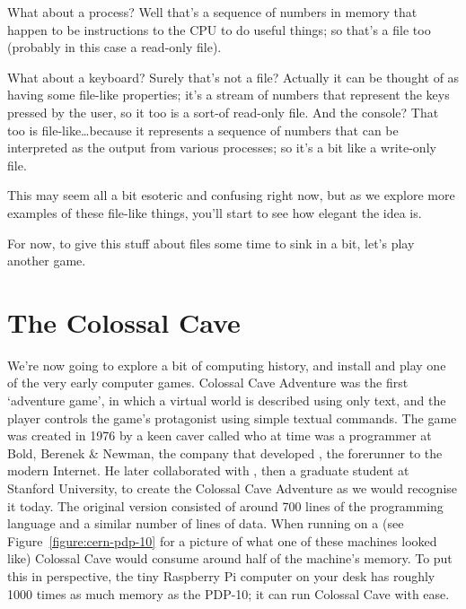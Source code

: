 What about a process? Well that's a sequence of numbers in memory that happen to be instructions to the CPU to do useful things; so that's a file too (probably in this case a read-only file). 

What about a keyboard? Surely that's not a file? Actually it can be thought of as having some file-like properties; it's a stream of numbers that represent the keys pressed by the user, so it too is a sort-of read-only file. And the console? That too is file-like\ldots because it represents a sequence of numbers that can be interpreted as the output from various processes; so it's a bit like a write-only file. 

This may seem all a bit esoteric and confusing right now, but as we explore more examples of these file-like things, you'll start to see how elegant the idea is. 

For now, to give this stuff about files some time to sink in a bit, let's play another game. 

\FloatBarrier
\section{The Colossal Cave}

We're now going to explore a bit of computing history, and install and play one of the very early computer games. Colossal Cave Adventure was the first `adventure game', in which a virtual world is described using only text, and the player controls the game's protagonist using simple textual commands. The game was created in 1976 by a keen caver called  who at time was a programmer at Bold, Berenek \& Newman, the company that developed , the forerunner to the modern Internet. He later collaborated with , then a graduate student at Stanford University, to create the Colossal Cave Adventure as we would recognise it today. The original version consisted of around 700 lines of the  programming language and a similar number of lines of data. When running on a  (see Figure~\ref{figure:cern-pdp-10} for a picture of what one of these machines looked like) Colossal Cave would consume around half of the machine's memory. To put this in perspective, the tiny Raspberry Pi computer on your desk has roughly 1000 times as much memory as the PDP-10; it can run Colossal Cave with ease. 


